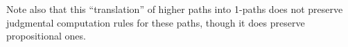 \documentclass[hott-all.tex]{subfiles}
\begin{document}
% 
\begin{rmk}
  Note also that this ``translation'' of higher paths into 1-paths does not preserve judgmental computation rules for these paths, though it does preserve propositional ones.
\end{rmk}
% 
% 
% 
% 
\end{document}
